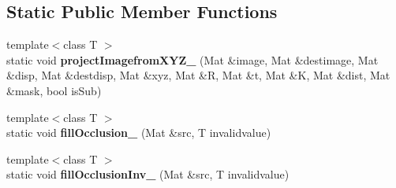\subsection*{Static Public Member Functions}
\begin{DoxyCompactItemize}
\item 
{\footnotesize template$<$class T $>$ }\\static void {\bfseries project\+Imagefrom\+X\+Y\+Z\+\_\+} (Mat \&image, Mat \&destimage, Mat \&disp, Mat \&destdisp, Mat \&xyz, Mat \&R, Mat \&t, Mat \&K, Mat \&dist, Mat \&mask, bool is\+Sub)\hypertarget{class_reconstruction3_d_a0224a67026665053a6e73733c2cf8384}{}\label{class_reconstruction3_d_a0224a67026665053a6e73733c2cf8384}

\item 
{\footnotesize template$<$class T $>$ }\\static void {\bfseries fill\+Occlusion\+\_\+} (Mat \&src, T invalidvalue)\hypertarget{class_reconstruction3_d_af7400ace09cc0c4f6dd1a9cd3596b46c}{}\label{class_reconstruction3_d_af7400ace09cc0c4f6dd1a9cd3596b46c}

\item 
{\footnotesize template$<$class T $>$ }\\static void {\bfseries fill\+Occlusion\+Inv\+\_\+} (Mat \&src, T invalidvalue)\hypertarget{class_reconstruction3_d_a6222d1f7eaffb47789bf199fbf332bac}{}\label{class_reconstruction3_d_a6222d1f7eaffb47789bf199fbf332bac}

\end{DoxyCompactItemize}
